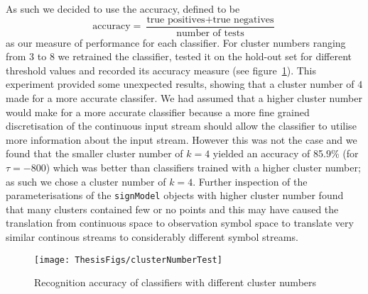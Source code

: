 As such we decided to use the accuracy, defined to be 
\begin{equation*}
\text{accuracy} = \frac{\text{true positives}+\text{true negatives}}{\text{number of tests}}
\end{equation*}
as our measure of performance for each classifier. For cluster numbers ranging from $3$ to $8$ we retrained the classifier, tested it on the hold-out set for different threshold values and recorded its accuracy measure (see figure~\ref{fig:clustTest}). This experiment provided some unexpected results, showing that a cluster number of $4$ made for a more accurate classifer. We had assumed that a higher cluster number would make for a more accurate classifier because a more fine grained discretisation of the continuous input stream should allow the classifier to utilise more information about the input stream. However this was not the case and we found that the smaller cluster number of $k=4$ yielded an accuracy of 85.9\% (for $\tau = -800$) which was better than classifiers trained with a higher cluster number; as such we chose a cluster number of $k=4$. Further inspection of the parameterisations of the \verb|signModel| objects with higher cluster number found that many clusters contained few or no points and this may have caused the translation from continuous space to observation symbol space to translate very similar continous streams to considerably different symbol streams.

\begin{figure}[]
        \centering
        \texttt{[image: ThesisFigs/clusterNumberTest]}
        \caption{Recognition accuracy of classifiers with different cluster numbers}\label{fig:clustTest}
\end{figure}


